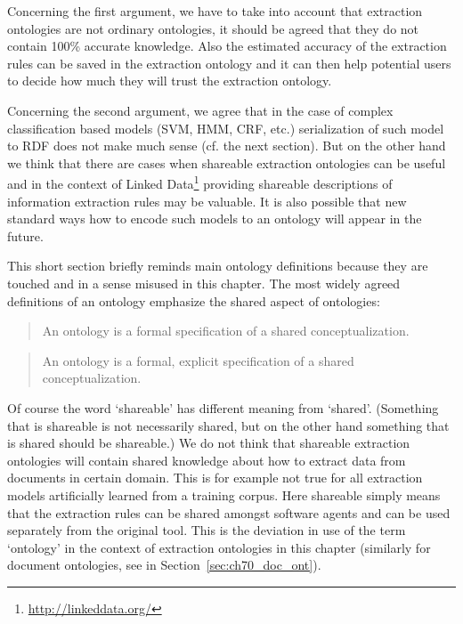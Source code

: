 Concerning the first argument, we have to take into account that extraction ontologies are not ordinary ontologies, it should be agreed that they do not contain 100\% accurate knowledge. Also the estimated accuracy of the extraction rules can be saved in the extraction ontology and it can then help potential users to decide how much they will trust the extraction ontology.

Concerning the second argument, we agree that in the case of complex classification based models (SVM, HMM, CRF, etc.) serialization of such model to RDF does not make much sense (cf. the next section). But on the other hand we think that there are cases when shareable extraction ontologies can be useful and in the context of Linked Data\footnote{\url{http://linkeddata.org/}} providing shareable descriptions of information extraction rules may be valuable. It is also possible that new standard ways how to encode such models to an ontology will appear in the future.


This short section briefly reminds main ontology definitions because they are touched and in a sense misused in this chapter. The most widely agreed definitions of an ontology emphasize the shared aspect of ontologies: 
\begin{quote}
An ontology is a formal specification of a shared conceptualization.	\citep{so17864}
\end{quote}

\begin{quote}
An ontology is a formal, explicit specification of a shared conceptualization. \citep{Studer1998161}
\end{quote}

Of course the word `shareable' has different meaning from `shared'. (Something that is shareable is not necessarily shared, but on the other hand something that is shared should be shareable.) We do not think that shareable extraction ontologies will contain shared knowledge about how to extract data from documents in certain domain. This is for example not true for all extraction models artificially learned from a training corpus. Here shareable simply means that the extraction rules can be shared amongst software agents and can be used separately from the original tool. This is the deviation in use of the term `ontology' in the context of extraction ontologies in this chapter (similarly for document ontologies, see in Section~\ref{sec:ch70_doc_ont}).






